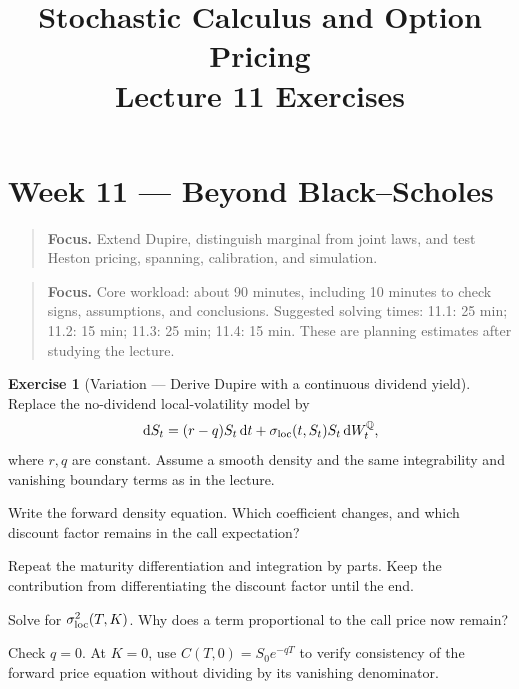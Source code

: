 \documentclass[11pt]{article}
\title{Stochastic Calculus and Option Pricing\\Lecture 11 Exercises}
\author{}
\date{}
\newcommand{\Qbb}{\mathbb Q}
\newcommand{\dd}{\,\mathrm d}
\theoremstyle{definition}
\newtheorem{exercise}{Exercise}[section]
\newcommand{\lecturesummary}[1]{\begin{quote}\small\textbf{Focus.} #1\end{quote}}
\begin{document}
\maketitle
\vspace{-1.2em}
\setcounter{section}{10}
\fi

\section{Week 11 --- Beyond Black--Scholes}
\lecturesummary{Extend Dupire, distinguish marginal from joint laws, and test Heston pricing, spanning, calibration, and simulation.}

\ifIncludeCore

\lecturesummary{Core workload: about 90 minutes, including 10 minutes to check signs, assumptions, and conclusions. Suggested solving times: 11.1: 25 min; 11.2: 15 min; 11.3: 25 min; 11.4: 15 min. These are planning estimates after studying the lecture.}
\setcounter{exercise}{0}
\begin{exercise}[Variation --- Derive Dupire with a continuous dividend yield]
Replace the no-dividend local-volatility model by
\[
\dd S_t=(r-q)S_t\dd t+\sigma_{\rm loc}(t,S_t)S_t\dd W_t^{\Qbb},
\]
where \(r,q\) are constant. Assume a smooth density and the same
integrability and vanishing boundary terms as in the lecture.
\begin{exparts}
\item Write the forward density equation. Which coefficient changes, and which discount factor remains in the call expectation?
\item Repeat the maturity differentiation and integration by parts. Keep the contribution from differentiating the discount factor until the end.
\item Solve for \(\sigma_{\rm loc}^2(T,K)\). Why does a term proportional to the call price now remain?
\item Check \(q=0\). At \(K=0\), use \(C(T,0)=S_0e^{-qT}\) to verify consistency of the forward price equation without dividing by its vanishing denominator.
\end{exparts}
\end{exercise}
\end{document}
